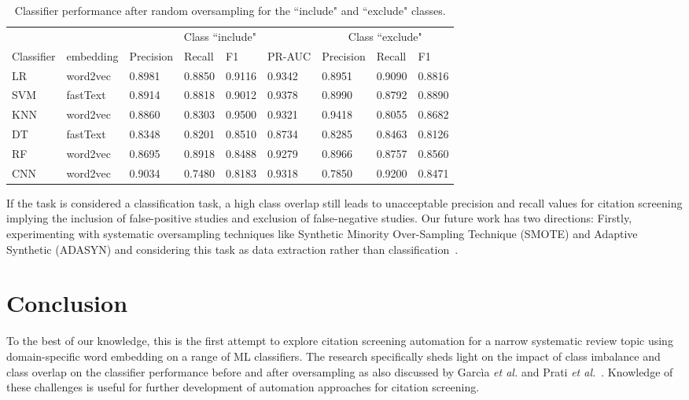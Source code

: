 \documentclass{IOS-Book-Article}
\begin{document}
\begin{table}[h]
    \centering
     \begin{tabular}{ p{1cm}p{1.2cm}|p{0.9cm}p{0.8cm}p{0.7cm}p{1.1cm}|p{0.9cm}p{0.8cm}p{0.7cm}  }
       \multicolumn{2}{c|}{} &  \multicolumn{4}{c|}{Class ``include"} &  \multicolumn{3}{c}{Class ``exclude"}\\
     Classifier & embedding & Precision & Recall & F1 & PR-AUC & Precision & Recall & F1 \\
     \hline
     LR  &   word2vec  & 0.8981   & 0.8850  & 0.9116  & 0.9342 &  0.8951  & 0.9090 & 0.8816 \\
     SVM    & fastText & 0.8914 &  0.8818 & 0.9012 & 0.9378 &    0.8990  & 0.8792 & 0.8890 \\
     KNN    & word2vec & 0.8860 &  0.8303  & 0.9500  & 0.9321  & 0.9418 & 0.8055 &   0.8682 \\
     DT &   fastText  & 0.8348 & 0.8201  & 0.8510 & 0.8734 &   0.8285  & 0.8463 & 0.8126 \\
     RF  & word2vec  & 0.8695   & 0.8918  & 0.8488 & 0.9279 & 0.8966   &  0.8757  & 0.8560 \\
     CNN    & word2vec  & 0.9034 & 0.7480  & 0.8183 & 0.9318 &   0.7850  & 0.9200 & 0.8471 \\
     \hline
     \end{tabular}
    \caption{Classifier performance after random oversampling for the ``include" and ``exclude" classes.}
    \label{tab3:oversampling}
\end{table}

If the task is considered a classification task, a high class overlap still leads to unacceptable precision and recall values for citation screening implying the inclusion of false-positive studies and exclusion of false-negative studies.
Our future work has two directions: Firstly, experimenting with systematic oversampling techniques like Synthetic Minority Over-Sampling Technique (SMOTE) and Adaptive Synthetic (ADASYN) and considering this task as data extraction rather than classification~\cite{Chawla2002-gn}.
%
\section{Conclusion}
%
To the best of our knowledge, this is the first attempt to explore citation screening automation for a narrow systematic review topic using domain-specific word embedding on a range of ML classifiers.
The research specifically sheds light on the impact of class imbalance and class overlap on the classifier performance before and after oversampling as also discussed by Garc{\`i}a \textit{et al.} and Prati \textit{et al.}~\cite{Garcia2006-wn, pmid25738806}.
Knowledge of these challenges is useful for further development of automation approaches for citation screening.
%
 
%

%
\end{document}
